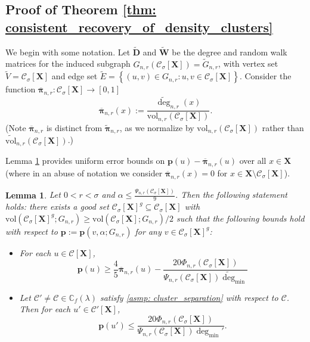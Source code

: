 \documentclass{article}
\newcommand{\set}[1]{\left\{#1\right\}}
\newcommand{\vol}{\mathrm{vol}}
\newcommand{\1}{\mathbf{1}}
\newcommand{\degminpr}{\deg_{\min}'}
\newcommand{\degminwt}{\widetilde{\deg}_{\min}}
\newcommand{\pbf}{\mathbf{p}}
\newcommand{\pibf}{\bm{\pi}}
\newcommand{\Xbf}{\mathbf{X}}
\newcommand{\Wbf}{\mathbf{W}}
\newcommand{\Dbf}{\mathbf{D}}
\newcommand{\Cbb}{\mathbb{C}}
\newcommand{\Cset}{\mathcal{C}}
\newcommand{\Csig}{\Cset_{\sigma}}
\theoremstyle{aldenthm}
\newtheorem{lemma}{Lemma}
\begin{document}
\subsection{Proof of Theorem \ref{thm: consistent_recovery_of_density_clusters}}
\label{sec: proof_of_consistent_cluster_recovery}

We begin with some notation. Let $\widetilde{\Dbf}$ and $\widetilde{\Wbf}$ be the degree and random walk matrices for the induced subgraph $G_{n,r}(\Csig[\Xbf]) = \widetilde{G}_{n,r}$, with vertex set $\widetilde{V} = \Csig[\Xbf]$ and edge set $\widetilde{E} = \set{(u,v) \in G_{n,r}: u,v \in \Csig[\Xbf]}$. Consider the function $\overline{\pibf}_{n,r}: \Csig[\Xbf] \to [0,1]$ 
\begin{equation*}
\overline{\pibf}_{n,r}(x) := \frac{\widetilde{\deg}_{n,r}(x)}{\vol_{n,r}(\Csig[\Xbf])}.
\end{equation*}
(Note $\overline{\pibf}_{n,r}$ is distinct from $\widetilde{\pibf}_{n,r}$, as we normalize by $\vol_{n,r}(\Csig[\Xbf])$ rather than $\widetilde{\vol}_{n,r}(\Csig[\Xbf])$.)

Lemma \ref{lem: setup} provides uniform error bounds on $\pbf(u) - \overline{\pibf}_{n,r}(u)$ over all $x \in \Xbf$ (where in an abuse of notation we consider $\overline{\pibf}_{n,r}(x) = 0$ for $x \in \Xbf \setminus \Csig[\Xbf]$). 
\begin{lemma} 
	\label{lem: setup}
	Let $0 < r < \sigma$ and $\alpha \leq \frac{\Psi_{n,r}(\Csig[\Xbf])}{9}$. Then the following statement holds: there exists a good set $\Csig[\Xbf]^g \subseteq \Csig[\Xbf]$ with $\vol(\Csig[\Xbf]^g; G_{n,r}) \geq \vol(\Csig[\Xbf]; G_{n,r})/2$ such that the following bounds hold with respect to $\pbf := \pbf(v,\alpha;G_{n,r})$ for any $v \in \Csig[\Xbf]^g$:
	\begin{itemize}
		\item For each $u \in \Cset[\Xbf]$,
		\begin{equation}
		\label{eqn: lower_bound_PPR_in_cluster}
		\pbf(u) \geq \frac{4}{5} \overline{\pibf}_{n,r}(u) - \frac{20 \Phi_{n,r}(\Csig[\Xbf])}{\Psi_{n,r}(\Csig[\Xbf]) \degminwt}
		\end{equation}
		\item Let $\Cset' \neq \Cset \in \Cbb_f(\lambda)$ satisfy \ref{asmp: cluster_separation} with respect to $\Cset$. Then for each $u' \in \Cset'[\Xbf]$,
		\begin{equation}
		\label{eqn: upper_bound_PPR_in_other_cluster}
		\pbf(u') \leq \frac{20 \Phi_{n,r}(\Csig[\Xbf])}{\Psi_{n,r}(\Csig[\Xbf]) \degminpr}.
		\end{equation}
	\end{itemize}
\end{lemma}
\end{document}
